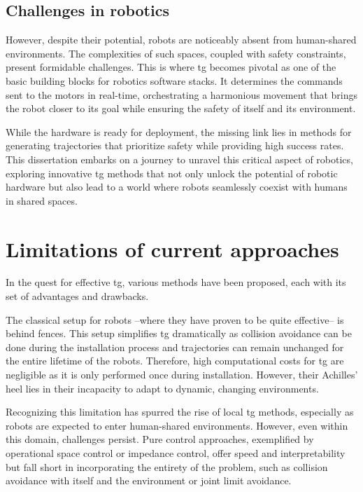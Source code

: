 \subsection{Challenges in robotics}

However, despite their potential, robots are noticeably
absent from human-shared environments. The complexities of
such spaces, coupled with safety constraints, present
formidable challenges. This is where \ac{tg}
becomes pivotal as one of the basic building blocks for
robotics software stacks. It determines the commands sent to
the motors in real-time, orchestrating a harmonious movement
that brings the robot closer to its goal while ensuring the
safety of itself and its environment.

While the hardware is ready for deployment, the
missing link lies in methods for generating trajectories
that prioritize safety while providing high success rates.
This dissertation embarks on a journey to unravel this
critical aspect of robotics, exploring innovative \ac{tg}
methods that not only unlock the potential of
robotic hardware but also lead to a world where robots
seamlessly coexist with humans in shared spaces.

\section{Limitations of current approaches}

In the quest for effective \ac{tg}, various
methods have been proposed, each with its set of advantages and
drawbacks.

The classical setup for robots --where they have
proven to be quite effective-- is behind fences. This setup
simplifies \ac{tg} dramatically as collision
avoidance can be done during the installation process and
trajectories can remain unchanged for the entire lifetime of
the robots. Therefore, high computational costs for
\ac{tg} are negligible as it is only performed
once during installation. However, their Achilles' heel lies
in their incapacity to adapt to dynamic, changing
environments.

Recognizing this limitation has spurred the rise of local
\ac{tg} methods, especially as robots are
expected to enter human-shared environments. However, even
within this domain, challenges persist. Pure control
approaches, exemplified by operational space control or
impedance control, offer speed and interpretability but fall
short in incorporating the entirety of the problem, such as
collision avoidance with itself and the environment or
joint limit avoidance.

